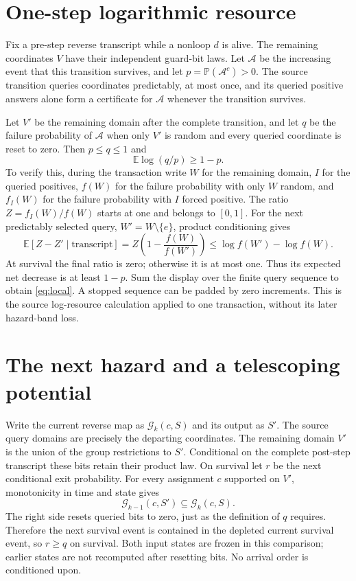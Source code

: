 \documentclass[11pt]{article}
\newcommand{\E}{\mathbb E}
\newcommand{\Prb}{\mathbb P}
\begin{document}
\section{One-step logarithmic resource}

Fix a pre-step reverse transcript while a nonloop $d$ is alive. The remaining
coordinates $V$ have their independent guard-bit laws. Let $\mathcal A$ be
the increasing event that this transition survives, and let
$p=\Prb(\mathcal A^c)>0$. The source transition queries coordinates
predictably, at most once, and its queried positive answers alone form a
certificate for $\mathcal A$ whenever the transition survives.

Let $V'$ be the remaining domain after the complete transition, and let
$q$ be the failure probability of $\mathcal A$ when only $V'$ is random
and every queried coordinate is reset to zero. Then $p\le q\le1$ and
\begin{equation}\label{eq:local}
 \E\log(q/p)\ge1-p.
\end{equation}
To verify this, during the transaction write $W$ for the remaining domain,
$I$ for the queried positives, $f(W)$ for the failure probability with only
$W$ random, and $f_I(W)$ for the failure probability with $I$ forced positive.
The ratio $Z=f_I(W)/f(W)$ starts at one and belongs to $[0,1]$.
For the next predictably selected query, $W'=W\setminus\{e\}$, product
conditioning gives
\[
 \E[Z-Z'\mid\text{transcript}]
 =Z\left(1-\frac{f(W)}{f(W')}\right)
 \le\log f(W')-\log f(W).
\]
At survival the final ratio is zero; otherwise it is at most one.
Thus its expected net decrease is at least $1-p$. Sum the display over
the finite query sequence to obtain \eqref{eq:local}. A stopped sequence
can be padded by zero increments. This is the source log-resource
calculation applied to one transaction, without its later hazard-band loss.

\section{The next hazard and a telescoping potential}

Write the current reverse map as $\mathcal G_k(c,S)$ and its output as $S'$.
The source query domains are precisely the departing coordinates. The
remaining domain $V'$ is the union of the group restrictions to $S'$.
Conditional on the complete post-step transcript these bits retain their
product law. On survival let $r$ be the next conditional exit probability.
For every assignment $c$ supported on $V'$, monotonicity in time and state
gives
\[
 \mathcal G_{k-1}(c,S')\subseteq\mathcal G_k(c,S).
\]
The right side resets queried bits to zero, just as the definition of $q$
requires. Therefore the next survival event is contained in the depleted
current survival event, so $r\ge q$ on survival. Both input states are
frozen in this comparison; earlier states are not recomputed after resetting
bits. No arrival order is conditioned upon.
\end{document}
